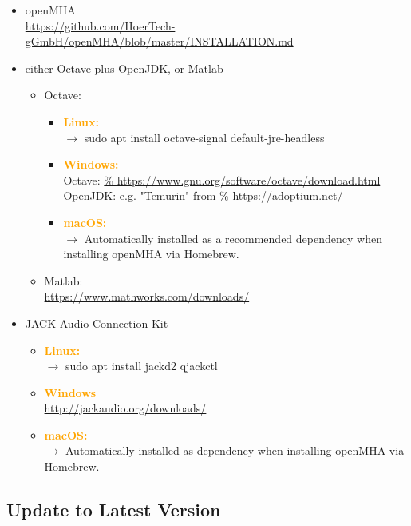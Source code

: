 \documentclass[11pt,a4paper,twoside]{article}
\newcommand{\+}{\discretionary{\mbox{\scriptsize$\hookleftarrow$}}{}{}}
\begin{document}
\begin{itemize}
\item \large{{openMHA}}   \\
  \footnotesize{\url{https://github.com/HoerTech-gGmbH/openMHA/blob/master/INSTALLATION.md}}
\item \large{{either Octave plus OpenJDK, or Matlab}}
  \begin{itemize}
  \item \large{{Octave:}}
    \begin{itemize}
    \item \textcolor{orange}{\textbf{\large{Linux:}}} \\
      $\rightarrow$ {\ttfamily sudo apt install octave-signal default-jre-headless}
    \item \textcolor{orange}{\textbf{Windows:}} \\
      \footnotesize{Octave: \url{%
          https://www.gnu.org/software/octave/download.html}} \\
      \footnotesize{OpenJDK: e.g. "Temurin" from \url{%
          https://adoptium.net/}}
    \item \textcolor{orange}{\textbf{macOS:}} \\
      $\rightarrow$ Automatically installed as a recommended dependency
      when installing openMHA via Homebrew.
    \end{itemize}
  \item \large{{Matlab:}} \\
    \footnotesize{\url{https://www.mathworks.com/downloads/}}
  \end{itemize}
\item \large{{JACK Audio Connection Kit}}
  \begin{itemize}
  \item \textcolor{orange}{\textbf{Linux:}} \\
    $\rightarrow$ {\ttfamily sudo apt install jackd2 qjackctl}
  \item \textcolor{orange}{\textbf{Windows}} \\
    \footnotesize{\url{http://jackaudio.org/downloads/}}
  \item \textcolor{orange}{\textbf{macOS:}} \\
    $\rightarrow$
    Automatically installed as dependency when installing openMHA via Homebrew.
  \end{itemize}
\end{itemize}



\subsection{Update to Latest Version}
\end{document}
